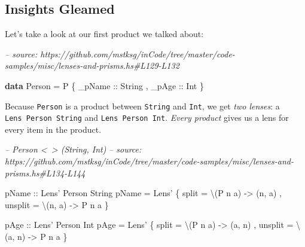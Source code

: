 \documentclass[]{article}
\newenvironment{Shaded}{}{}
\newcommand{\CommentTok}[1]{\textcolor[rgb]{0.38,0.63,0.69}{\textit{#1}}}
\newcommand{\DataTypeTok}[1]{\textcolor[rgb]{0.56,0.13,0.00}{#1}}
\newcommand{\FunctionTok}[1]{\textcolor[rgb]{0.02,0.16,0.49}{#1}}
\newcommand{\KeywordTok}[1]{\textcolor[rgb]{0.00,0.44,0.13}{\textbf{#1}}}
\newcommand{\NormalTok}[1]{#1}
\newcommand{\OtherTok}[1]{\textcolor[rgb]{0.00,0.44,0.13}{#1}}
\begin{document}
\hypertarget{insights-gleamed}{%
\subsection{Insights Gleamed}\label{insights-gleamed}}

Let's take a look at our first product we talked about:

\begin{Shaded}
\begin{Highlighting}[]
\CommentTok{-- source: https://github.com/mstksg/inCode/tree/master/code-samples/misc/lenses-and-prisms.hs#L129-L132}

\KeywordTok{data} \DataTypeTok{Person} \FunctionTok{=} \DataTypeTok{P}
\NormalTok{    \{}\OtherTok{ _pName ::} \DataTypeTok{String}
\NormalTok{    ,}\OtherTok{ _pAge  ::} \DataTypeTok{Int}
\NormalTok{    \}}
\end{Highlighting}
\end{Shaded}

Because \texttt{Person} is a product between \texttt{String} and \texttt{Int},
we get \emph{two lenses}: a \texttt{Lens\textquotesingle{}\ Person\ String} and
\texttt{Lens\textquotesingle{}\ Person\ Int}. \emph{Every product} gives us a
lens for every item in the product.

\begin{Shaded}
\begin{Highlighting}[]
\CommentTok{-- Person <~> (String, Int)}
\CommentTok{-- source: https://github.com/mstksg/inCode/tree/master/code-samples/misc/lenses-and-prisms.hs#L134-L144}

\OtherTok{pName ::} \DataTypeTok{Lens'} \DataTypeTok{Person} \DataTypeTok{String}
\NormalTok{pName }\FunctionTok{=} \DataTypeTok{Lens'}
\NormalTok{    \{ split   }\FunctionTok{=}\NormalTok{ \textbackslash{}(}\DataTypeTok{P}\NormalTok{ n a) }\OtherTok{->}\NormalTok{ (n, a)}
\NormalTok{    , unsplit }\FunctionTok{=}\NormalTok{ \textbackslash{}(n, a)  }\OtherTok{->} \DataTypeTok{P}\NormalTok{ n a}
\NormalTok{    \}}

\OtherTok{pAge ::} \DataTypeTok{Lens'} \DataTypeTok{Person} \DataTypeTok{Int}
\NormalTok{pAge }\FunctionTok{=} \DataTypeTok{Lens'}
\NormalTok{    \{ split   }\FunctionTok{=}\NormalTok{ \textbackslash{}(}\DataTypeTok{P}\NormalTok{ n a) }\OtherTok{->}\NormalTok{ (a, n)}
\NormalTok{    , unsplit }\FunctionTok{=}\NormalTok{ \textbackslash{}(a, n)  }\OtherTok{->} \DataTypeTok{P}\NormalTok{ n a}
\NormalTok{    \}}
\end{Highlighting}
\end{Shaded}
\end{document}
